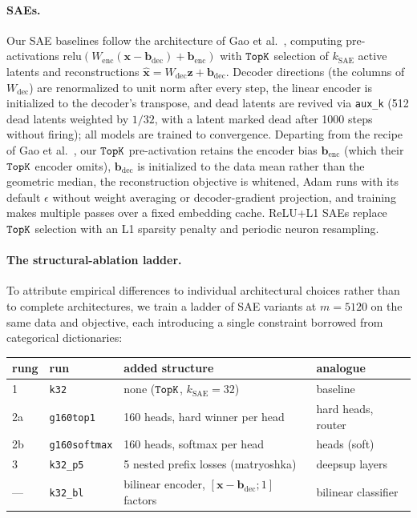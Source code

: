 \paragraph{SAEs.}
Our SAE baselines follow the architecture of Gao et al.~\cite{gao2024},
computing pre-activations
$\mathrm{relu}(W_{\mathrm{enc}}(\mathbf{x}-\mathbf{b}_{\mathrm{dec}})+\mathbf{b}_{\mathrm{enc}})$
with $\mathop{\mathtt{TopK}}\limits$ selection of $k_{\mathrm{SAE}}$ active latents and
reconstructions $\hat{\mathbf{x}} = W_{\mathrm{dec}}\mathbf{z} + \mathbf{b}_{\mathrm{dec}}$.
Decoder directions (the columns of $W_{\mathrm{dec}}$) are renormalized to
unit norm after every step, the linear encoder is initialized to the
decoder's transpose, and dead latents are revived via \texttt{aux\_k} (512
dead latents weighted by $1/32$, with a latent marked dead after 1000 steps
without firing); all models are trained to convergence. Departing from the
recipe of Gao et al.~\cite{gao2024}, our $\mathop{\mathtt{TopK}}\limits$ pre-activation retains the
encoder bias $\mathbf{b}_{\mathrm{enc}}$ (which their $\mathop{\mathtt{TopK}}\limits$ encoder
omits), $\mathbf{b}_{\mathrm{dec}}$ is initialized to the data mean rather
than the geometric median, the reconstruction objective is whitened, Adam
runs with its default $\epsilon$ without weight averaging or
decoder-gradient projection, and training makes multiple passes over a
fixed embedding cache. ReLU+L1 SAEs replace $\mathop{\mathtt{TopK}}\limits$ selection with an L1
sparsity penalty and periodic neuron resampling.

\paragraph{The structural-ablation ladder.}
To attribute empirical differences to individual architectural choices
rather than to complete architectures, we train a ladder of SAE variants at
$m{=}5120$ on the same data and objective, each introducing a single
constraint borrowed from categorical dictionaries:

\begin{center}
\begin{tabular}{@{}llll@{}}
\toprule
rung & run & added structure & analogue \\
\midrule
1  & \texttt{k32} & none ($\mathop{\mathtt{TopK}}\limits$, $k_{\mathrm{SAE}}{=}32$) & baseline \\
2a & \texttt{g160top1} & 160 heads, hard winner per head & hard heads, router \\
2b & \texttt{g160softmax} & 160 heads, softmax per head & heads (soft) \\
3  & \texttt{k32\_p5} & 5 nested prefix losses (matryoshka) & deepsup layers \\
--- & \texttt{k32\_bl} & bilinear encoder, $[\mathbf{x}{-}\mathbf{b}_{\mathrm{dec}};1]$ factors & bilinear classifier \\
\bottomrule
\end{tabular}
\end{center}

